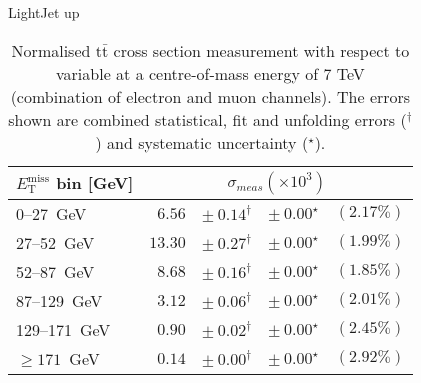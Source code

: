 \documentclass{article}
\newcommand{\ttbar}{\ensuremath{\text{t}\bar{\text{t}}}\xspace}
\newcommand{\GeV}{GeV}
\begin{document}
LightJet up
\begin{table}[htbp]
\setlength{\tabcolsep}{2pt}
\centering
\caption{Normalised \ttbar cross section measurement with respect to \MET variable
at a centre-of-mass energy of 7 TeV (combination of electron and muon channels). The errors shown are combined statistical, fit and unfolding errors ($^\dagger$) and systematic uncertainty ($^\star$).}
\label{tab:MET_xsections_7TeV_LightJet_up_combined}
\begin{tabular}{lrrrr}
\hline
$E_{\mathrm{T}}^{\mathrm{miss}}$ bin [\GeV] & \multicolumn{4}{c}{$\sigma_{meas} \left(\times 10^{3}\right)$}\\ 
\hline
0--27~\GeV &  $6.56$ & $ \pm~ 0.14^\dagger$ & $ \pm~ 0.00^\star$ & $(2.17\%)$\\ 
27--52~\GeV &  $13.30$ & $ \pm~ 0.27^\dagger$ & $ \pm~ 0.00^\star$ & $(1.99\%)$\\ 
52--87~\GeV &  $8.68$ & $ \pm~ 0.16^\dagger$ & $ \pm~ 0.00^\star$ & $(1.85\%)$\\ 
87--129~\GeV &  $3.12$ & $ \pm~ 0.06^\dagger$ & $ \pm~ 0.00^\star$ & $(2.01\%)$\\ 
129--171~\GeV &  $0.90$ & $ \pm~ 0.02^\dagger$ & $ \pm~ 0.00^\star$ & $(2.45\%)$\\ 
$\geq 171$~\GeV &  $0.14$ & $ \pm~ 0.00^\dagger$ & $ \pm~ 0.00^\star$ & $(2.92\%)$\\ 
\hline 
\end{tabular}
\end{table}
\end{document}

